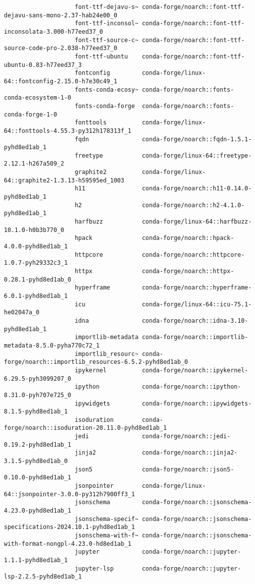 \documentclass{article}
\begin{document}
\begin{enumerate}
\begin{itemize}
\begin{itemize}
\begin{itemize}
\begin{verbatim}
					font-ttf-dejavu-s~ conda-forge/noarch::font-ttf-dejavu-sans-mono-2.37-hab24e00_0 
					font-ttf-inconsol~ conda-forge/noarch::font-ttf-inconsolata-3.000-h77eed37_0 
					font-ttf-source-c~ conda-forge/noarch::font-ttf-source-code-pro-2.038-h77eed37_0 
					font-ttf-ubuntu    conda-forge/noarch::font-ttf-ubuntu-0.83-h77eed37_3 
					fontconfig         conda-forge/linux-64::fontconfig-2.15.0-h7e30c49_1 
					fonts-conda-ecosy~ conda-forge/noarch::fonts-conda-ecosystem-1-0 
					fonts-conda-forge  conda-forge/noarch::fonts-conda-forge-1-0 
					fonttools          conda-forge/linux-64::fonttools-4.55.3-py312h178313f_1 
					fqdn               conda-forge/noarch::fqdn-1.5.1-pyhd8ed1ab_1 
					freetype           conda-forge/linux-64::freetype-2.12.1-h267a509_2 
					graphite2          conda-forge/linux-64::graphite2-1.3.13-h59595ed_1003 
					h11                conda-forge/noarch::h11-0.14.0-pyhd8ed1ab_1 
					h2                 conda-forge/noarch::h2-4.1.0-pyhd8ed1ab_1 
					harfbuzz           conda-forge/linux-64::harfbuzz-10.1.0-h0b3b770_0 
					hpack              conda-forge/noarch::hpack-4.0.0-pyhd8ed1ab_1 
					httpcore           conda-forge/noarch::httpcore-1.0.7-pyh29332c3_1 
					httpx              conda-forge/noarch::httpx-0.28.1-pyhd8ed1ab_0 
					hyperframe         conda-forge/noarch::hyperframe-6.0.1-pyhd8ed1ab_1 
					icu                conda-forge/linux-64::icu-75.1-he02047a_0 
					idna               conda-forge/noarch::idna-3.10-pyhd8ed1ab_1 
					importlib-metadata conda-forge/noarch::importlib-metadata-8.5.0-pyha770c72_1 
					importlib_resourc~ conda-forge/noarch::importlib_resources-6.5.2-pyhd8ed1ab_0 
					ipykernel          conda-forge/noarch::ipykernel-6.29.5-pyh3099207_0 
					ipython            conda-forge/noarch::ipython-8.31.0-pyh707e725_0 
					ipywidgets         conda-forge/noarch::ipywidgets-8.1.5-pyhd8ed1ab_1 
					isoduration        conda-forge/noarch::isoduration-20.11.0-pyhd8ed1ab_1 
					jedi               conda-forge/noarch::jedi-0.19.2-pyhd8ed1ab_1 
					jinja2             conda-forge/noarch::jinja2-3.1.5-pyhd8ed1ab_0 
					json5              conda-forge/noarch::json5-0.10.0-pyhd8ed1ab_1 
					jsonpointer        conda-forge/linux-64::jsonpointer-3.0.0-py312h7900ff3_1 
					jsonschema         conda-forge/noarch::jsonschema-4.23.0-pyhd8ed1ab_1 
					jsonschema-specif~ conda-forge/noarch::jsonschema-specifications-2024.10.1-pyhd8ed1ab_1 
					jsonschema-with-f~ conda-forge/noarch::jsonschema-with-format-nongpl-4.23.0-hd8ed1ab_1 
					jupyter            conda-forge/noarch::jupyter-1.1.1-pyhd8ed1ab_1 
					jupyter-lsp        conda-forge/noarch::jupyter-lsp-2.2.5-pyhd8ed1ab_1 

\end{verbatim}
\end{itemize}
\end{itemize}
\end{itemize}
\end{enumerate}
\end{document}
